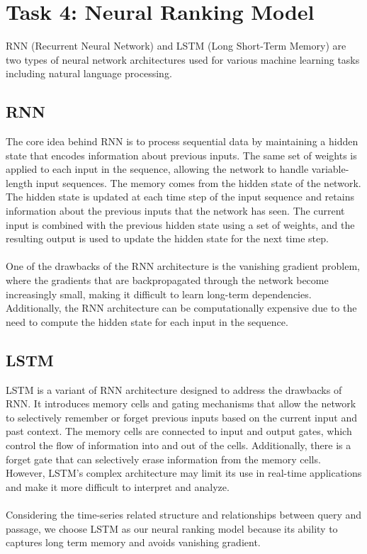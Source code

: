 \section{Task 4: Neural Ranking Model}
RNN (Recurrent Neural Network) and LSTM (Long Short-Term Memory) are two types of neural network architectures used for various machine learning tasks including natural language processing.
\subsection{RNN}
The core idea behind RNN is to process sequential data by maintaining a hidden state that encodes information about previous inputs. The same set of weights is applied to each input in the sequence, allowing the network to handle variable-length input sequences. The memory comes from the hidden state of the network. The hidden state is updated at each time step of the input sequence and retains information about the previous inputs that the network has seen. The current input is combined with the previous hidden state using a set of weights, and the resulting output is used to update the hidden state for the next time step.
\\\\
One of the drawbacks of the RNN architecture is the vanishing gradient problem, where the gradients that are backpropagated through the network become increasingly small, making it difficult to learn long-term dependencies. Additionally, the RNN architecture can be computationally expensive due to the need to compute the hidden state for each input in the sequence.
\subsection{LSTM}
LSTM is a variant of RNN architecture designed to address the drawbacks of RNN. It introduces memory cells and gating mechanisms that allow the network to selectively remember or forget previous inputs based on the current input and past context. The memory cells are connected to input and output gates, which control the flow of information into and out of the cells. Additionally, there is a forget gate that can selectively erase information from the memory cells. However, LSTM's complex architecture may limit its use in real-time applications and make it more difficult to interpret and analyze.
\\\\
Considering the time-series related structure and relationships between query and passage, we choose LSTM as our neural ranking model because its ability to captures long term memory and avoids vanishing gradient.
